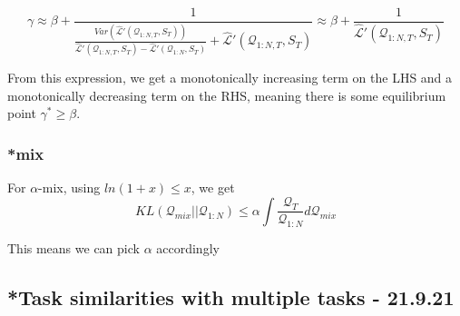 \documentclass[letterpaper]{article}
\theoremstyle{definition}
\newtheorem{assumption}{Assumption}
\begin{document}
 $$\gamma\approx \beta + \frac{1}{\frac{Var(\hat{\mathcal{L}}'(\mathcal{Q}_{1:N,T},S_T))}{\hat{\mathcal{L}}'(\mathcal{Q}_{1:N,T}, S_T)-\hat{\mathcal{L}}'(\mathcal{Q}_{1:N},S_T)}+\hat{\mathcal{L}}'(\mathcal{Q}_{1:N,T}, S_T)}\approx \beta + \frac{1}{\hat{\mathcal{L}}'(\mathcal{Q}_{1:N,T}, S_T)}$$
 
 From this expression, we get a monotonically increasing term on the LHS and a monotonically decreasing term on the RHS, meaning there is some equilibrium point $\gamma^*\geq \beta$.




\subsubsection{*mix}

For $\alpha$-mix, using $ln(1+x)\leq x$, we get 
$$KL(\mathcal{Q}_{mix}||\mathcal{Q}_{1:N})\leq \alpha\int \frac{\mathcal{Q}_{T}}{\mathcal{Q}_{1:N}}d\mathcal{Q}_{mix} $$

This means we can pick $\alpha$ accordingly


\subsection{*Task similarities with multiple tasks - 21.9.21}

%
%	
%
%
%
\end{document}

